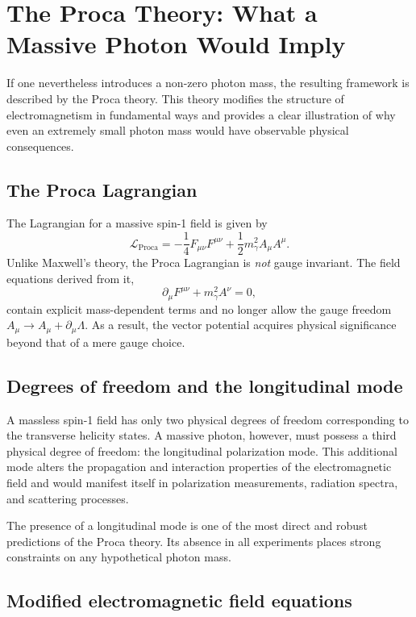 \section{The Proca Theory: What a Massive Photon Would Imply}

If one nevertheless introduces a non-zero photon mass, the resulting 
framework is described by the Proca theory. This theory modifies the 
structure of electromagnetism in fundamental ways and provides a 
clear illustration of why even an extremely small photon mass would 
have observable physical consequences.

\subsection*{The Proca Lagrangian}

The Lagrangian for a massive spin-1 field is given by
\[
\mathcal{L}_{\mathrm{Proca}} 
= -\frac{1}{4}F_{\mu\nu}F^{\mu\nu} 
+ \frac{1}{2}m_\gamma^2 A_\mu A^\mu .
\]
Unlike Maxwell’s theory, the Proca Lagrangian is \emph{not} gauge invariant. 
The field equations derived from it,
\[
\partial_\mu F^{\mu\nu} + m_\gamma^2 A^\nu = 0 ,
\]
contain explicit mass-dependent terms and no longer allow the gauge 
freedom $A_\mu \rightarrow A_\mu + \partial_\mu \Lambda$. As a result, 
the vector potential acquires physical significance beyond that of a 
mere gauge choice.

\subsection*{Degrees of freedom and the longitudinal mode}

A massless spin-1 field has only two physical degrees of freedom 
corresponding to the transverse helicity states. A massive photon, 
however, must possess a third physical degree of freedom: the 
longitudinal polarization mode. This additional mode alters the 
propagation and interaction properties of the electromagnetic field and 
would manifest itself in polarization measurements, radiation spectra, 
and scattering processes.

The presence of a longitudinal mode is one of the most direct and robust 
predictions of the Proca theory. Its absence in all experiments places 
strong constraints on any hypothetical photon mass.

\subsection*{Modified electromagnetic field equations}

